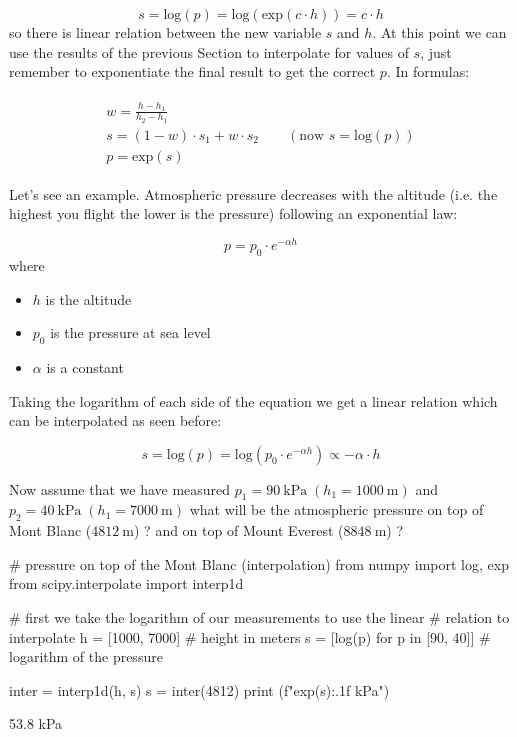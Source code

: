 \begin{equation}
s = \mathrm{log}(p) = \mathrm{log}(\mathrm{exp}(c \cdot h)) = c \cdot h
\end{equation}
so there is linear relation between the new variable $s$ and $h$. At this point we can use the results of the previous Section to interpolate for values of $s$, just remember to exponentiate the final result to get the correct $p$. In formulas:

\begin{align}
\label{eq:log_interp}
\begin{gathered}
w = \frac{h - h_1}{h_2 - h_1} \\
s = (1 - w)\cdot s_1 + w \cdot s_2\qquad (\textrm{now } s = \textrm{log}(p))\\
p = \textrm{exp}(s)
\end{gathered}
\end{align}

Let's see an example. Atmospheric pressure decreases with the altitude (i.e. the highest you flight the lower is the pressure) following an exponential law:

\begin{equation}
p = p_0\cdot e^{-\alpha h}
\end{equation}
where
\begin{itemize}
\tightlist
\item $h$ is the altitude
\item $p_0$ is the pressure at sea level
\item $\alpha$ is a constant
\end{itemize}

Taking the logarithm of each side of the equation we get a linear relation which can be interpolated as seen before:

\begin{equation}
s = \mathrm{log}(p) = \mathrm{log}(p_0\cdot e^{-\alpha h})\propto - \alpha \cdot h
\end{equation}

Now assume that we have measured
$p_1 = 90~\mathrm{kPa}\;(h_1 = 1000~\mathrm{m})$ and $p_2 = 40~\mathrm{kPa}\;(h_1 = 7000~\mathrm{m})$ what will be the atmospheric pressure on top of Mont Blanc ($4812~\mathrm{m}$) ? and on top of Mount Everest ($8848~\mathrm{m}$) ?

\begin{ipython}
# pressure on top of the Mont Blanc (interpolation)
from numpy import log, exp
from scipy.interpolate import interp1d

# first we take the logarithm of our measurements to use the linear
# relation to interpolate
h = [1000, 7000] # height in meters
s = [log(p) for p in [90, 40]] # logarithm of the pressure

inter = interp1d(h, s)
s = inter(4812)
print (f"{exp(s):.1f} kPa")
\end{ipython}
\begin{ioutput}
53.8 kPa
\end{ioutput}


